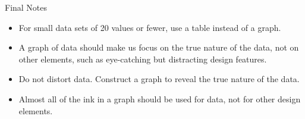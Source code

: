 \documentclass{beamer}
\begin{document}
\begin{frame}
\begin{block}{Final Notes}
\begin{itemize}[<+- | alert@+>]
\item For small data sets of 20 values or fewer, use a table instead of a graph.
\item A graph of data should make us focus on the true nature of the data, not on other elements, such as eye-catching but distracting design features.
\item Do not distort data. Construct a graph to reveal the true nature of the data.
\item Almost all of the ink in a graph should be used for data, not for other design elements.
\end{itemize}
\end{block}
\end{frame}
\end{document}

